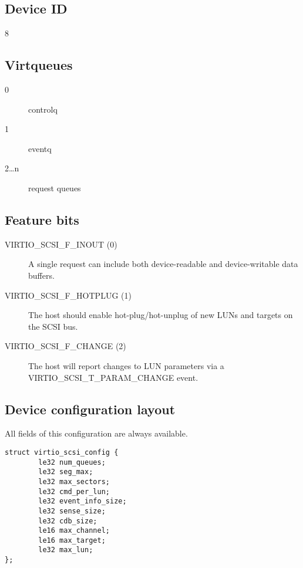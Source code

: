 \subsection{Device ID}\label{sec:Device Types / SCSI Host Device / Device ID}
  8

\subsection{Virtqueues}\label{sec:Device Types / SCSI Host Device / Virtqueues}

\begin{description}
\item[0] controlq
\item[1] eventq
\item[2\ldots n] request queues
\end{description}

\subsection{Feature bits}\label{sec:Device Types / SCSI Host Device / Feature bits}

\begin{description}
\item[VIRTIO_SCSI_F_INOUT (0)] A single request can include both
    device-readable and device-writable data buffers.

\item[VIRTIO_SCSI_F_HOTPLUG (1)] The host should enable
    hot-plug/hot-unplug of new LUNs and targets on the SCSI bus.

\item[VIRTIO_SCSI_F_CHANGE (2)] The host will report changes to LUN
    parameters via a VIRTIO_SCSI_T_PARAM_CHANGE event.
\end{description}

\subsection{Device configuration layout}\label{sec:Device Types / SCSI Host Device / Device configuration layout}

  All fields of this configuration are always available.

\begin{lstlisting}
struct virtio_scsi_config {
        le32 num_queues;
        le32 seg_max;
        le32 max_sectors;
        le32 cmd_per_lun;
        le32 event_info_size;
        le32 sense_size;
        le32 cdb_size;
        le16 max_channel;
        le16 max_target;
        le32 max_lun;
};
\end{lstlisting}

